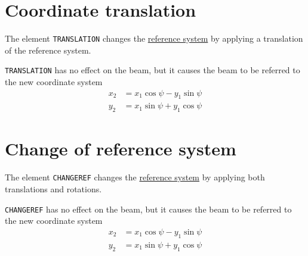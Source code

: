 \section{Coordinate translation}
\label{sec:translation}

The element \texttt{TRANSLATION} changes the
\hyperref[subsec:local-straight]{reference system} 
by applying a translation of the reference system.


\texttt{TRANSLATION} has no effect on the beam, but it causes the beam to be 
referred to the new coordinate system \\ 
\begin{equation}\begin{split}
    x_2 &= x_1 \cos\psi - y_1 \sin\psi \\
    y_2 &= x_1 \sin\psi + y_1 \cos\psi
\end{split}\end{equation}


\section{Change of reference system}
\label{sec:changeref}

The element \texttt{CHANGEREF} changes the
\hyperref[subsec:local-straight]{reference system} 
by applying both translations and rotations.


\texttt{CHANGEREF} has no effect on the beam, but it causes the beam to
be referred to the new coordinate system \\ 
\begin{equation}\begin{split}
    x_2 &= x_1 \cos\psi - y_1 \sin\psi \\
    y_2 &= x_1 \sin\psi + y_1 \cos\psi
\end{split}\end{equation}

